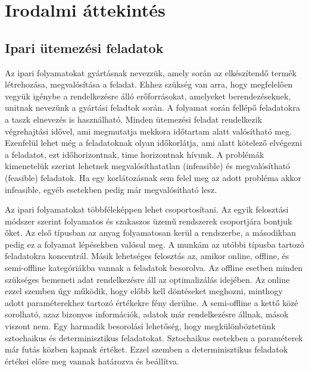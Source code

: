 \chapter{Irodalmi áttekintés}
\section{Ipari ütemezési feladatok}
Az ipari folyamatokat gyártásnak nevezzük, amely során az elkészítendő termék létrehozása, megvalósítása a feladat. Ehhez szükség van arra, hogy megfelelően vegyük igénybe a rendelkezésre álló erőforrásokat, amelyeket berendezéseknek, unitnak nevezünk a gyártási feladtok során. A folyamat során fellépő feladatokra a taszk elnevezés is használható. Minden ütemezési feladat rendelkezik végrehajtási idővel, ami megmutatja mekkora időtartam alatt valósítható meg. Ezenfelül lehet még a feladatoknak olyan időkorlátja, ami alatt kötelező elvégezni a feladatot, ezt időhorizontnak, time horizontnak hívunk. A problémák kimenetelük szerint lehetnek megvalósíthatatlan (infeasible) és megvalósítható (feasible) feladatok. Ha egy korlátozásnak sem felel meg az adott probléma akkor infeasible, egyéb esetekben pedig már megvalósítható lesz.

Az ipari folyamatokat többféleképpen lehet csoportosítani. Az egyik felosztási módszer szerint folyamatos és szakaszos üzemű rendszerek csoportjára bontjuk őket. Az első típusban az anyag folyamatosan kerül a rendszerbe, a másodikban pedig ez a folyamat lépésekben valósul meg. A munkám az utóbbi típusba tartozó feladatokra koncentrál. Másik lehetséges felosztás az, amikor online, offline, és semi-offline kategóriákba vannak a feladatok besorolva. Az offline esetben minden szükséges bemeneti adat rendelkezésre áll az optimalizálás idejében. Az online ezzel szemben úgy működik, hogy előbb kell döntéseket meghozni, minthogy adott paraméterekhez tartozó értékekre fény derülne. A semi-offline a kettő közé sorolható, azaz bizonyos információk, adatok már rendelkezésre állnak, mások viszont nem. Egy harmadik besorolási lehetőség, hogy megkülönböztetünk sztochaikus és determinisztikus feladatokat. Sztochaikus esetekben a paraméterek már futás közben kapnak értéket. Ezzel szemben a determinisztikus feladatok értékei előre meg vannak határozva és beállítva.

